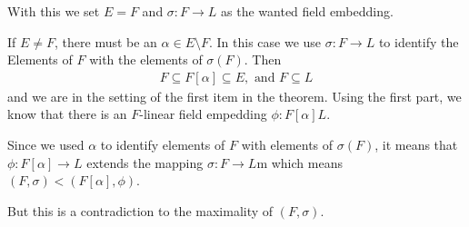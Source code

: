 With this we set $E = F$ and $\sigma: F \to L$ as the wanted field embedding.

If $E \neq F$, there must be an $\alpha \in E \setminus F$. In this case we use $\sigma: F \to L$ to identify the Elements of $F$ with the elements of $\sigma(F)$.
Then
\begin{align*}
	F \subseteq F[\alpha] \subseteq E, \text{ and } F \subseteq L
\end{align*}
and we are in the setting of the first item in the theorem. Using the first part, we know that there is an $F$-linear field empedding $\phi: F[\alpha] L$.

Since we used $\alpha$ to identify elements of $F$ with elements of $\sigma(F)$, it means that $\phi:F[\alpha] \to L$ extends the mapping $\sigma:F \to L$m which means $(F,\sigma) < (F[\alpha],\phi)$.

But this is a contradiction to the maximality of $(F,\sigma)$.

